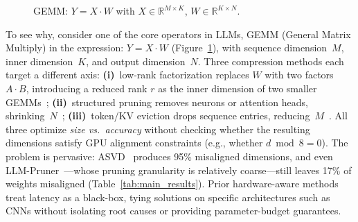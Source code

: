 \documentclass[sigplan,10pt]{acmart}
\begin{document}
\begin{figure}[t]
\centering
{}
\caption{GEMM: $Y{=}X{\cdot}W$ with $X{\in}\mathbb{R}^{M \times K}$,
$W{\in}\mathbb{R}^{K \times N}$.}
\label{fig:GEMM_dims}
\vspace{-0.2cm}
\end{figure}

To see why, consider one of the core operators in LLMs, GEMM (General Matrix Multiply) in the expression: $Y{=}X{\cdot}W$ (Figure~\ref{fig:GEMM_dims}), with sequence dimension~$M$, inner dimension~$K$, and output dimension~$N$.
Three compression methods each target a different axis:
\textbf{(i)}~low-rank factorization replaces $W$ with two factors $A{\cdot}B$, introducing a reduced rank $r$ as the inner dimension of two smaller GEMMs~\citep{asvd,palu,svdllm2024};
\textbf{(ii)}~structured pruning removes neurons or attention heads, shrinking~$N$~\citep{llmpruner};
\textbf{(iii)}~token/KV eviction drops sequence entries, reducing~$M$~\citep{h2o,pyramidkv}.
All three optimize \emph{size vs.\ accuracy} without checking whether the resulting dimensions satisfy GPU alignment constraints (e.g., whether $d \bmod 8 = 0$).
The problem is pervasive: ASVD~\citep{asvd} produces 95\% misaligned dimensions, and even LLM-Pruner~\citep{llmpruner}---whose pruning granularity is relatively coarse---still leaves 17\% of weights misaligned (Table~\ref{tab:main_results}).
Prior hardware-aware methods~\citep{halp2021,haloc2023} treat latency as a black-box, tying solutions on specific architectures such as CNNs without isolating root causes or providing parameter-budget guarantees.
\end{document}
